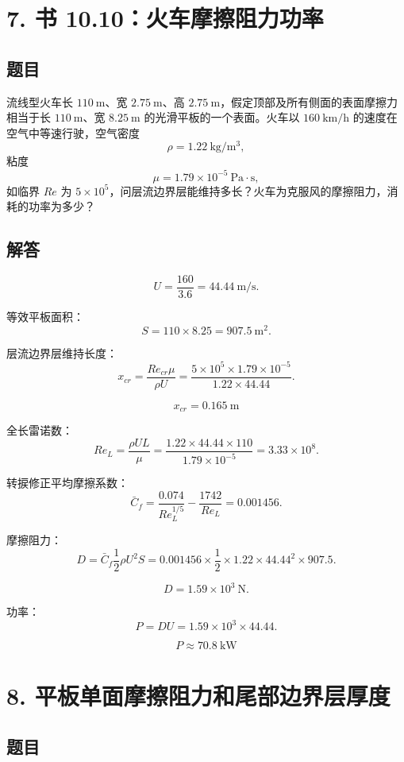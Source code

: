 \documentclass[11pt,a4paper]{ctexart}
\begin{document}
\section*{7. 书 10.10：火车摩擦阻力功率}

\subsection*{题目}

流线型火车长 \(110\ \mathrm{m}\)、宽 \(2.75\ \mathrm{m}\)、高 \(2.75\ \mathrm{m}\)，假定顶部及所有侧面的表面摩擦力相当于长 \(110\ \mathrm{m}\)、宽 \(8.25\ \mathrm{m}\) 的光滑平板的一个表面。火车以 \(160\ \mathrm{km/h}\) 的速度在空气中等速行驶，空气密度
\[
\rho=1.22\ \mathrm{kg/m^3},
\]
粘度
\[
\mu=1.79\times10^{-5}\ \mathrm{Pa\cdot s},
\]
如临界 \(Re\) 为 \(5\times10^5\)，问层流边界层能维持多长？火车为克服风的摩擦阻力，消耗的功率为多少？

\subsection*{解答}

\[
U=\frac{160}{3.6}=44.44\ \mathrm{m/s}.
\]

等效平板面积：
\[
S=110\times8.25=907.5\ \mathrm{m^2}.
\]

层流边界层维持长度：
\[
x_{cr}=\frac{Re_{cr}\mu}{\rho U}
=\frac{5\times10^5\times1.79\times10^{-5}}{1.22\times44.44}.
\]

\[
\boxed{x_{cr}=0.165\ \mathrm{m}}
\]

全长雷诺数：
\[
Re_L=\frac{\rho UL}{\mu}
=\frac{1.22\times44.44\times110}{1.79\times10^{-5}}
=3.33\times10^8.
\]

转捩修正平均摩擦系数：
\[
\bar C_f=\frac{0.074}{Re_L^{1/5}}-\frac{1742}{Re_L}
=0.001456.
\]

摩擦阻力：
\[
D=\bar C_f\frac12\rho U^2S
=0.001456\times\frac12\times1.22\times44.44^2\times907.5.
\]

\[
D=1.59\times10^3\ \mathrm{N}.
\]

功率：
\[
P=DU=1.59\times10^3\times44.44.
\]

\[
\boxed{P\approx70.8\ \mathrm{kW}}
\]

\section*{8. 平板单面摩擦阻力和尾部边界层厚度}

\subsection*{题目}
\end{document}
